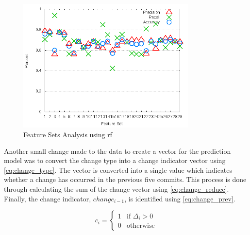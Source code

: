 
\renewcommand*{\thefootnote}{\arabic{footnote}}

\begin{figure}[!t]
    \centering
        \includegraphics[width=0.8\textwidth]{images/rf/test_6/acra_sample_range}
        \caption{Feature Sets Analysis using \gls{rf}}
        \label{fig:feature_set_acra_rf}
\end{figure}

Another small change made to the data to create a vector for the prediction model was to convert the change type into a change indicator vector using \autoref{eq:change_type}. The vector is converted into a single value which indicates whether a change has occurred in the previous five commits. This process is done through calculating the sum of the change vector using \autoref{eq:change_reduce}. Finally, the change indicator, $change_{i-1}$, is identified using \autoref{eq:change_prev}.

\begin{equation} 
\label{eq:change_type}
c_i = \left\{\begin{matrix}
1 & \text{if }\Delta_i > 0 \\
0 & \text{otherwise}
\end{matrix}\right.
\end{equation}

